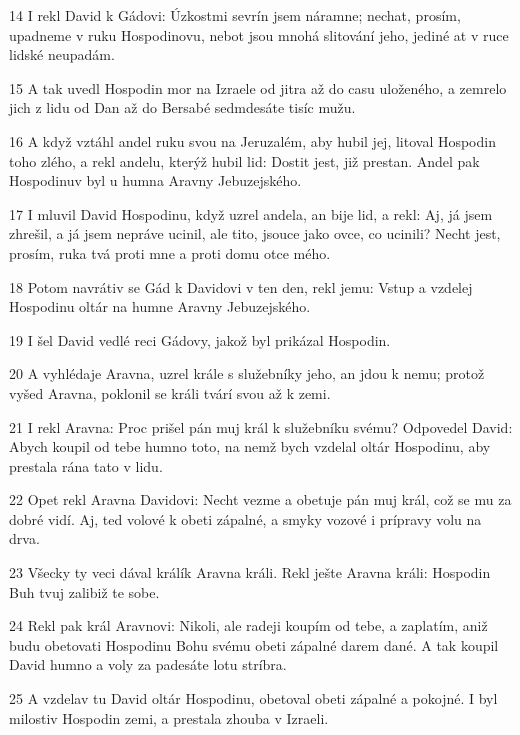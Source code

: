 \par 14 I rekl David k Gádovi: Úzkostmi sevrín jsem náramne; nechat, prosím, upadneme v ruku Hospodinovu, nebot jsou mnohá slitování jeho, jediné at v ruce lidské neupadám.
\par 15 A tak uvedl Hospodin mor na Izraele od jitra až do casu uloženého, a zemrelo jich z lidu od Dan až do Bersabé sedmdesáte tisíc mužu.
\par 16 A když vztáhl andel ruku svou na Jeruzalém, aby hubil jej, litoval Hospodin toho zlého, a rekl andelu, kterýž hubil lid: Dostit jest, již prestan. Andel pak Hospodinuv byl u humna Aravny Jebuzejského.
\par 17 I mluvil David Hospodinu, když uzrel andela, an bije lid, a rekl: Aj, já jsem zhrešil, a já jsem nepráve ucinil, ale tito, jsouce jako ovce, co ucinili? Necht jest, prosím, ruka tvá proti mne a proti domu otce mého.
\par 18 Potom navrátiv se Gád k Davidovi v ten den, rekl jemu: Vstup a vzdelej Hospodinu oltár na humne Aravny Jebuzejského.
\par 19 I šel David vedlé reci Gádovy, jakož byl prikázal Hospodin.
\par 20 A vyhlédaje Aravna, uzrel krále s služebníky jeho, an jdou k nemu; protož vyšed Aravna, poklonil se králi tvárí svou až k zemi.
\par 21 I rekl Aravna: Proc prišel pán muj král k služebníku svému? Odpovedel David: Abych koupil od tebe humno toto, na nemž bych vzdelal oltár Hospodinu, aby prestala rána tato v lidu.
\par 22 Opet rekl Aravna Davidovi: Necht vezme a obetuje pán muj král, což se mu za dobré vidí. Aj, ted volové k obeti zápalné, a smyky vozové i prípravy volu na drva.
\par 23 Všecky ty veci dával králík Aravna králi. Rekl ješte Aravna králi: Hospodin Buh tvuj zalibiž te sobe.
\par 24 Rekl pak král Aravnovi: Nikoli, ale radeji koupím od tebe, a zaplatím, aniž budu obetovati Hospodinu Bohu svému obeti zápalné darem dané. A tak koupil David humno a voly za padesáte lotu stríbra.
\par 25 A vzdelav tu David oltár Hospodinu, obetoval obeti zápalné a pokojné. I byl milostiv Hospodin zemi, a prestala zhouba v Izraeli.


